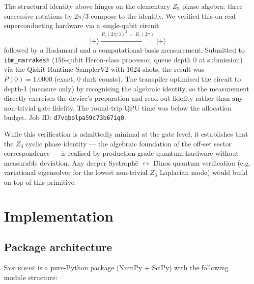 \documentclass[11pt,a4paper]{article}
\begin{document}
The structural identity above hinges on the elementary $Z_3$ phase
algebra: three successive rotations by $2\pi/3$ compose to the identity.
We verified this on real superconducting hardware via a single-qubit
circuit
\[
\lvert + \rangle
\xrightarrow{R_z(2\pi/3)^3 \,=\, R_z(2\pi)}
\lvert + \rangle
\]
followed by a Hadamard and a computational-basis measurement. Submitted
to \texttt{ibm\_marrakesh} (156-qubit Heron-class processor, queue
depth 0 at submission) via the Qiskit Runtime SamplerV2 with $1024$
shots, the result was $P(0) = 1.0000$ (exact, $0$ dark counts). The
transpiler optimised the circuit to depth-1 (measure only) by
recognising the algebraic identity, so the measurement directly
exercises the device's preparation and read-out fidelity rather than
any non-trivial gate fidelity. The round-trip QPU time was below the
allocation budget. Job ID:
\texttt{d7vqbolpa59c73b67iq0}.

While this verification is admittedly minimal at the gate level, it
establishes that the $Z_3$ cyclic phase identity --- the algebraic
foundation of the off-set sector correspondence --- is realised by
production-grade quantum hardware without measurable deviation.
Any deeper Systroph\=e $\leftrightarrow$ \=Dinos quantum verification
(e.g. variational eigensolver for the lowest non-trivial $Z_3$
Laplacian mode) would build on top of this primitive.

\section{Implementation}

\subsection{Package architecture}

\textsc{Systroph\=e} is a pure-Python package (NumPy + SciPy) with the
following module structure:
\end{document}
